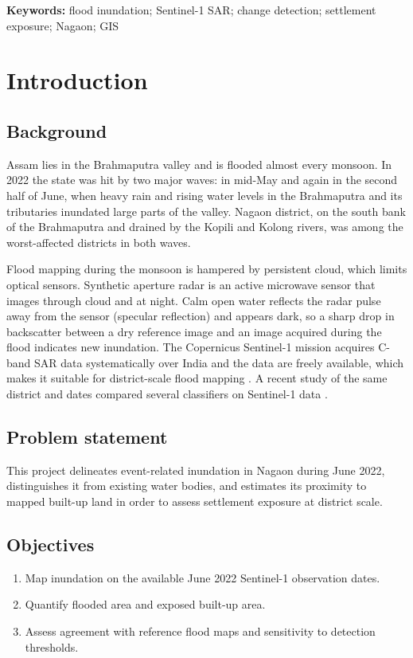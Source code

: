 \documentclass[11pt,a4paper]{article}
\begin{document}
\noindent\textbf{Keywords:} flood inundation; Sentinel-1 SAR; change detection; settlement exposure; Nagaon; GIS

\newpage
\tableofcontents
\newpage

\section{Introduction}
\subsection{Background}
Assam lies in the Brahmaputra valley and is flooded almost every monsoon. In 2022 the state was hit
by two major waves: in mid-May and again in the second half of June, when heavy rain and rising
water levels in the Brahmaputra and its tributaries inundated large parts of the valley. Nagaon district,
on the south bank of the Brahmaputra and drained by the Kopili and Kolong rivers, was among the
worst-affected districts in both waves.

Flood mapping during the monsoon is hampered by persistent cloud, which limits optical sensors.
Synthetic aperture radar is an active microwave sensor that images through cloud and at night.
Calm open water reflects the radar pulse away from the sensor (specular reflection) and appears dark,
so a sharp drop in backscatter between a dry reference image and an image acquired during the
flood indicates new inundation. The Copernicus Sentinel-1 mission acquires C-band SAR data
systematically over India and the data are freely available, which makes it suitable for district-scale
flood mapping \cite{twele}. A recent study of the same district and dates compared several
classifiers on Sentinel-1 data \cite{irukumati}.

\subsection{Problem statement}
This project delineates event-related inundation in Nagaon during June 2022, distinguishes it from
existing water bodies, and estimates its proximity to mapped built-up land in order to assess settlement
exposure at district scale.

\subsection{Objectives}
\begin{enumerate}
\item Map inundation on the available June 2022 Sentinel-1 observation dates.
\item Quantify flooded area and exposed built-up area.
\item Assess agreement with reference flood maps and sensitivity to detection thresholds.
\end{enumerate}
\end{document}
